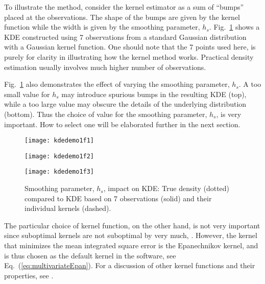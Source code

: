 To illustrate the method, consider the kernel estimator as a sum of
``bumps'' placed at the observations. The shape of the bumps are given
by the kernel function while the width is given by the smoothing
parameter, $h_{s}$. Fig.~\ref{fig:kdedemo1} shows a KDE constructed
 using 7 observations from a standard Gaussian distribution with a
 Gaussian kernel function. One should note that the 7 points used
 here, is purely for clarity in
 illustrating how the kernel method works. Practical density
 estimation usually involves much higher number of observations.

 Fig.~\ref{fig:kdedemo1} also demonstrates the effect of varying
 the smoothing parameter, $h_{s}$. A too small value for $h_{s}$ may introduce
 spurious bumps in the resulting KDE (top), while a too large value
 may obscure the details of the underlying distribution (bottom).
 Thus the choice of value for the smoothing parameter,
 $h_{s}$, is very important. How to select one will be elaborated
 further in the next section.

\begin{figure}[!p]
  \begin{minipage}[b]{\linewidth}%
    \centering \texttt{[image: kdedemo1f1]}
  \end{minipage} %
\vfill
  \begin{minipage}[b]{\linewidth}%
    \centering \texttt{[image: kdedemo1f2]}
  \end{minipage} %
\vfill
  \begin{minipage}[b]{\linewidth}%
    \centering  \texttt{[image: kdedemo1f3]}
  \end{minipage} %
  \caption[Smoothing parameter, $h_{s}$, impact on KDE]{Smoothing
    parameter, $h_{s}$, impact on KDE:
    True density (dotted) compared to KDE based on 7 observations
    (solid) and their individual kernels (dashed). }  \label{fig:kdedemo1}
\end{figure}


The particular choice of kernel function, on the other hand, is
not very important since suboptimal kernels are not suboptimal by
very much, \citep[see][pp.\ 31]{WandAndJones1995Kernel}.
However, the kernel that minimizes the
mean integrated square error is the Epanechnikov kernel, and
is thus chosen as the default kernel in the software, see
Eq.~(\ref{eq:multivariateEpan}).
For a discussion of other kernel functions and their properties,
see \cite{WandAndJones1995Kernel}. 


